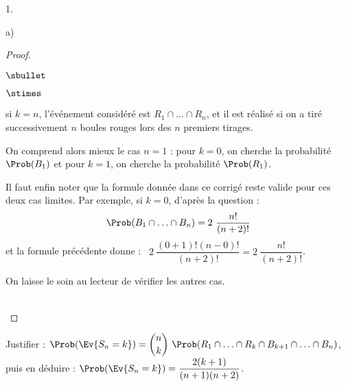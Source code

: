 \documentclass[11pt]{article}%
\begin{document}
\begin{noliste}{1.}
\begin{noliste}{a)}
\begin{proof}
\begin{remark}
\begin{noliste}{$\sbullet$}
\begin{noliste}{$\stimes$}
          \item si $k = n$, l'événement considéré est $R_1 \cap \ldots
            \cap R_n$, et il est réalisé si on a tiré successivement
            $n$ boules rouges lors des $n$ premiers tirages.
          \end{noliste}

        \item On comprend alors mieux le cas $n = 1$ : pour $k = 0$,
          on cherche la probabilité $\Prob(B_1)$ et pour $k = 1$, on
          cherche la probabilité $\Prob(R_1)$.

        \item Il faut enfin noter que la formule donnée dans ce
          corrigé reste valide pour ces deux cas limites. Par exemple,
          si $k = 0$, d'après la question  :
          \[
          \Prob(B_1 \cap \ldots \cap B_n) = 2 \ \dfrac{n!}{(n+2)!}
          \]
          et la formule précédente donne : \ $2 \ \dfrac{(0+1)!
            (n-0)!}{(n+2)!} = 2 \ \dfrac{n!}{(n+2)!}$.

        \item On laisse le soin au lecteur de vérifier les autres cas.
        \end{noliste}
      \end{remark}~\\[-1.4cm]
    \end{proof}


    \newpage


  \item Justifier : $\Prob(\Ev{S_n = k}) = \dbinom{n}{k} \ \Prob(R_1
    \cap \ldots \cap R_k \cap B_{k+1} \cap \ldots \cap B_n)$,\\
    puis en déduire : $\Prob(\Ev{S_n = k}) =
    \dfrac{2(k+1)}{(n+1)(n+2)}$.


\end{noliste}
\end{noliste}
\end{document}
